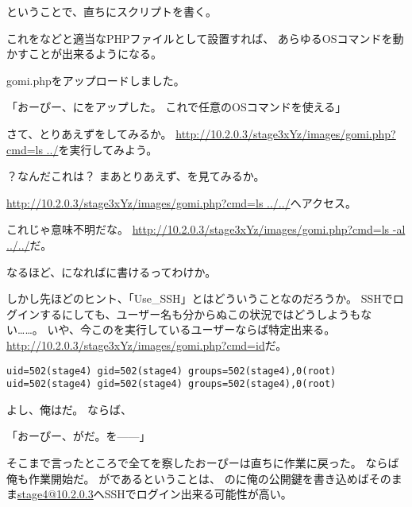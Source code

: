ということで、直ちにスクリプトを書く。



これをなどと適当なPHPファイルとして設置すれば、
あらゆるOSコマンドを動かすことが出来るようになる。

\begin{screen}
\centering
gomi.phpをアップロードしました。
\end{screen}

「おーぴー、にをアップした。
これで任意のOSコマンドを使える」

さて、とりあえずをしてみるか。
\url{http://10.2.0.3/stage3xYz/images/gomi.php?cmd=ls ../}を実行してみよう。


？なんだこれは？
まあとりあえず、を見てみるか。

\url{http://10.2.0.3/stage3xYz/images/gomi.php?cmd=ls ../../}へアクセス。


これじゃ意味不明だな。
\url{http://10.2.0.3/stage3xYz/images/gomi.php?cmd=ls -al ../../}だ。



なるほど、になればに書けるってわけか。

しかし先ほどのヒント、「Use\_SSH」とはどういうことなのだろうか。
SSHでログインするにしても、ユーザー名も分からぬこの状況ではどうしようもない……。
いや、今このを実行しているユーザーならば特定出来る。
\url{http://10.2.0.3/stage3xYz/images/gomi.php?cmd=id}だ。

\begin{lstlisting}
uid=502(stage4) gid=502(stage4) groups=502(stage4),0(root) uid=502(stage4) gid=502(stage4) groups=502(stage4),0(root) 
\end{lstlisting}

よし、俺はだ。
ならば、

「おーぴー、がだ。を------」

そこまで言ったところで全てを察したおーぴーは直ちに作業に戻った。
ならば俺も作業開始だ。
がであるということは、
のに俺の公開鍵を書き込めばそのまま\url{stage4@10.2.0.3}へSSHでログイン出来る可能性が高い。

